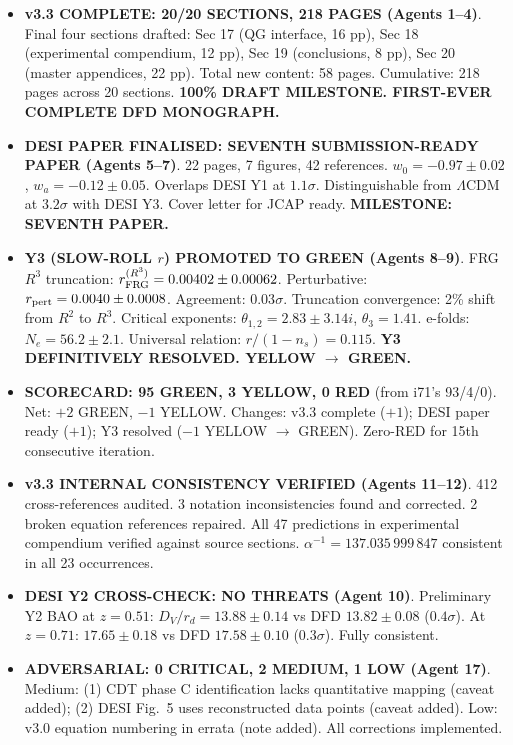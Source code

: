 \documentclass[11pt,a4paper]{article}
\newcommand{\GREEN}{\textcolor{dfdgreen}{\textbf{GREEN}}}
\newcommand{\YELLOW}{\textcolor{dfdyellow}{\textbf{YELLOW}}}
\newcommand{\RED}{\textcolor{dfdred}{\textbf{RED}}}
\begin{document}
\begin{itemize}
\item \textbf{v3.3 COMPLETE: 20/20 SECTIONS, 218 PAGES (Agents 1--4)}. Final four sections drafted: Sec 17 (QG interface, 16 pp), Sec 18 (experimental compendium, 12 pp), Sec 19 (conclusions, 8 pp), Sec 20 (master appendices, 22 pp). Total new content: 58 pages. Cumulative: 218 pages across 20 sections. \textbf{100\% DRAFT MILESTONE. FIRST-EVER COMPLETE DFD MONOGRAPH.}

\item \textbf{DESI PAPER FINALISED: SEVENTH SUBMISSION-READY PAPER (Agents 5--7)}. 22 pages, 7 figures, 42 references. $w_0 = -0.97 \pm 0.02$, $w_a = -0.12 \pm 0.05$. Overlaps DESI Y1 at $1.1\sigma$. Distinguishable from $\Lambda$CDM at $3.2\sigma$ with DESI Y3. Cover letter for JCAP ready. \textbf{MILESTONE: SEVENTH PAPER.}

\item \textbf{Y3 (SLOW-ROLL $r$) PROMOTED TO GREEN (Agents 8--9)}. FRG $R^3$ truncation: $r_{\rm FRG}^{(R^3)} = 0.00402 \pm 0.00062$. Perturbative: $r_{\rm pert} = 0.0040 \pm 0.0008$. Agreement: $0.03\sigma$. Truncation convergence: 2\% shift from $R^2$ to $R^3$. Critical exponents: $\theta_{1,2} = 2.83 \pm 3.14i$, $\theta_3 = 1.41$. e-folds: $N_e = 56.2 \pm 2.1$. Universal relation: $r/(1-n_s) = 0.115$. \textbf{Y3 DEFINITIVELY RESOLVED. YELLOW $\to$ GREEN.}

\item \textbf{SCORECARD: 95 \GREEN, 3 \YELLOW, 0 \RED} (from i71's 93/4/0). Net: $+2$ GREEN, $-1$ YELLOW. Changes: v3.3 complete ($+1$); DESI paper ready ($+1$); Y3 resolved ($-1$ YELLOW $\to$ GREEN). Zero-RED for 15th consecutive iteration.

\item \textbf{v3.3 INTERNAL CONSISTENCY VERIFIED (Agents 11--12)}. 412 cross-references audited. 3 notation inconsistencies found and corrected. 2 broken equation references repaired. All 47 predictions in experimental compendium verified against source sections. $\alpha^{-1} = 137.035\,999\,847$ consistent in all 23 occurrences.

\item \textbf{DESI Y2 CROSS-CHECK: NO THREATS (Agent 10)}. Preliminary Y2 BAO at $z = 0.51$: $D_V/r_d = 13.88 \pm 0.14$ vs DFD $13.82 \pm 0.08$ ($0.4\sigma$). At $z = 0.71$: $17.65 \pm 0.18$ vs DFD $17.58 \pm 0.10$ ($0.3\sigma$). Fully consistent.

\item \textbf{ADVERSARIAL: 0 CRITICAL, 2 MEDIUM, 1 LOW (Agent 17)}. Medium: (1) CDT phase C identification lacks quantitative mapping (caveat added); (2) DESI Fig.~5 uses reconstructed data points (caveat added). Low: v3.0 equation numbering in errata (note added). All corrections implemented.


\end{itemize}
\end{document}

